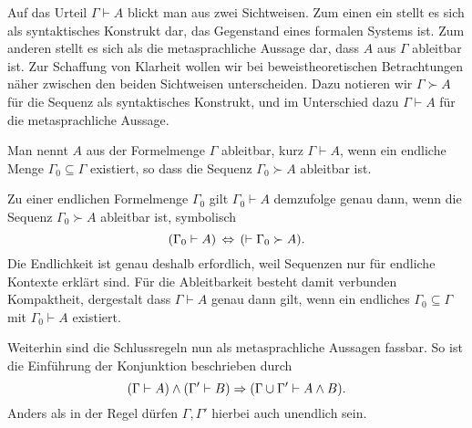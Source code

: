 Auf das Urteil $\Gamma\vdash A$ blickt man aus zwei Sichtweisen. Zum
einen ein stellt es sich als syntaktisches Konstrukt dar, das Gegenstand
eines formalen Systems ist. Zum anderen stellt es sich als die
metasprachliche Aussage dar, dass $A$ aus $\Gamma$ ableitbar ist. Zur
Schaffung von Klarheit wollen wir bei beweistheoretischen Betrachtungen
näher zwischen den beiden Sichtweisen unterscheiden. Dazu notieren
wir $\Gamma\succ A$ für die Sequenz als syntaktisches Konstrukt,
und im Unterschied dazu $\Gamma\vdash A$ für die metasprachliche Aussage.
\begin{Definition}[Ableitbarkeit]\newlinefirst
Man nennt $A$ aus der Formelmenge $\Gamma$ ableitbar, kurz
$\Gamma\vdash A$, wenn ein endliche Menge $\Gamma_0\subseteq\Gamma$
existiert, so dass die Sequenz $\Gamma_0\succ A$ ableitbar ist.
\end{Definition}
Zu einer endlichen Formelmenge $\Gamma_0$ gilt $\Gamma_0\vdash A$
demzufolge genau dann, wenn die Sequenz $\Gamma_0\succ A$ ableitbar ist,
symbolisch%
\[(\Gamma_0\vdash A)\,\Leftrightarrow\, (\vdash \Gamma_0\succ A).\]
Die Endlichkeit ist genau deshalb erfordlich, weil Sequenzen nur für
endliche Kontexte erklärt sind. Für die Ableitbarkeit besteht damit
verbunden Kompaktheit, dergestalt dass $\Gamma\vdash A$ genau dann gilt,
wenn ein endliches $\Gamma_0\subseteq\Gamma$ mit $\Gamma_0\vdash A$
existiert.

Weiterhin sind die Schlussregeln nun als metasprachliche Aussagen
fassbar. So ist die Einführung der Konjunktion beschrieben durch%
\[(\Gamma\vdash A)\land (\Gamma'\vdash B)\Rightarrow (\Gamma\cup\Gamma'\vdash A\land B).\]
Anders als in der Regel dürfen $\Gamma,\Gamma'$ hierbei auch
unendlich sein.

